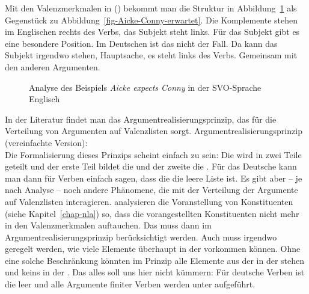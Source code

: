 Mit den Valenzmerkmalen in () bekommt man die Struktur in
Abbildung~\ref{fig-Aicke-expects-Conny} als Gegenstück zu
Abbildung~\ref{fig-Aicke-Conny-erwartet}. Die Komplemente stehen im Englischen rechts des Verbs, das
Subjekt steht links. Für das Subjekt gibt es eine besondere Position. Im Deutschen ist das nicht der
Fall. Da kann das Subjekt irgendwo stehen, Hauptsache, es steht links des Verbs. Gemeinsam mit den
anderen Argumenten.
\begin{figure}
\caption{\label{fig-Aicke-expects-Conny}Analyse des Beispiels \emph{Aicke expects Conny} in der
  SVO-Sprache Englisch}
\end{figure}


In der Literatur findet man das Argumentrealisierungsprinzip, das für die Verteilung von Argumenten
auf Valenzlisten sorgt.
\ea
Argumentrealisierungsprinzip (vereinfachte Version):\\
 \impl
{}
\z
Die Formalisierung dieses Prinzips scheint einfach zu sein: Die \argstl wird in zwei Teile geteilt
und der erste Teil bildet die \sprl und der zweite die \compsl. Für das Deutsche kann man dann
für Verben einfach sagen, dass die \sprl die leere Liste ist. Es gibt aber – je nach Analyse – noch andere Phänomene,
die mit der Verteilung der Argumente auf Valenzlisten interagieren. \citet[]{GSag2000a-u} analysieren
die Voranstellung von Konstituenten (siehe Kapitel~\ref{chap-nla}) so, dass die vorangestellten Konstituenten nicht mehr in den
Valenzmerkmalen auftauchen. Das muss dann im Argumentrealisierungsprinzip berücksichtigt
werden. Auch muss irgendwo geregelt werden, wie viele Elemente überhaupt in der \sprl vorkommen
können. Ohne eine solche Beschränkung könnten im Prinzip alle Elemente aus der \argstl in der \sprl
stehen und keins in der \compsl. Das alles soll uns hier nicht kümmern: Für deutsche Verben
ist die \sprl leer und alle Argumente finiter Verben werden unter \comps aufgeführt.

